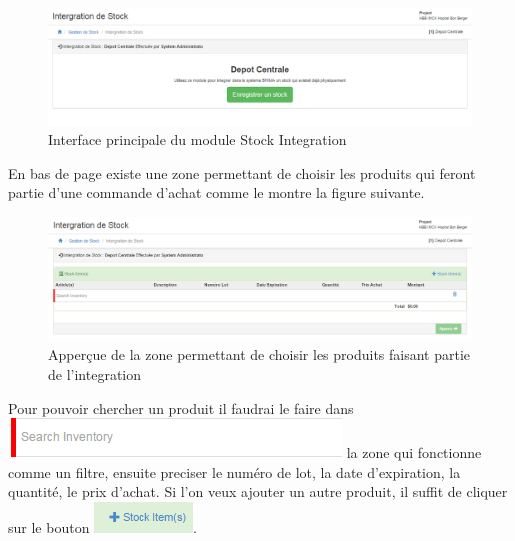 \documentclass[12pt,a4paper]{report}
\begin{document}
\begin{figure}[h]
\begin{center}
\includegraphics[width=14cm]{pic/IngraStock.png}
\end{center}
\caption{Interface principale du module Stock Integration}
\label{Interface principale du module Stock Integration}
\end{figure}

En bas de page existe une zone permettant de choisir les produits qui feront partie d'une commande d'achat comme le montre la figure suivante.

\begin{figure}[h]
\begin{center}
\includegraphics[width=12cm]{pic/MenuIntegrationStock.png}
\end{center}
\caption{Apperçue de la zone permettant de choisir les produits faisant partie de l'integration}
\label{Apperçue de la zone permettant de choisir les produits faisant partie de l'integration}
\end{figure} 

Pour pouvoir chercher un produit il faudrai le faire dans \includegraphics[scale=0.4]{pic/SearchInventory.png} la zone qui fonctionne comme un filtre, ensuite preciser le numéro de lot, la date d'expiration, la quantité, le prix d'achat. Si l'on veux ajouter un autre produit, il suffit de cliquer sur le bouton \includegraphics[scale=0.7]{pic/StockItem.png}.
\end{document}

